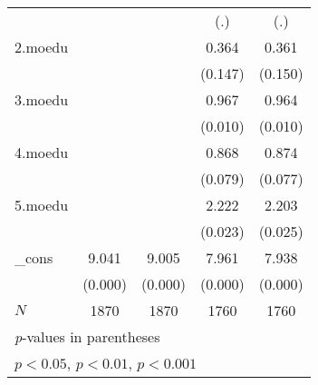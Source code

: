 {\begin{tabular}{l*{4}{c}}
            &                     &                     &         (.)         &         (.)         \\
[1em]
2.moedu     &                     &                     &       0.364         &       0.361         \\
            &                     &                     &     (0.147)         &     (0.150)         \\
[1em]
3.moedu     &                     &                     &       0.967\sym{**} &       0.964\sym{*}  \\
            &                     &                     &     (0.010)         &     (0.010)         \\
[1em]
4.moedu     &                     &                     &       0.868         &       0.874         \\
            &                     &                     &     (0.079)         &     (0.077)         \\
[1em]
5.moedu     &                     &                     &       2.222\sym{*}  &       2.203\sym{*}  \\
            &                     &                     &     (0.023)         &     (0.025)         \\
[1em]
\_cons      &       9.041\sym{***}&       9.005\sym{***}&       7.961\sym{***}&       7.938\sym{***}\\
            &     (0.000)         &     (0.000)         &     (0.000)         &     (0.000)         \\
\hline
\(N\)       &        1870         &        1870         &        1760         &        1760         \\
\hline\hline
\multicolumn{5}{l}{\footnotesize \textit{p}-values in parentheses}\\
\multicolumn{5}{l}{\footnotesize \sym{*} \(p<0.05\), \sym{**} \(p<0.01\), \sym{***} \(p<0.001\)}\\
\end{tabular}
}
